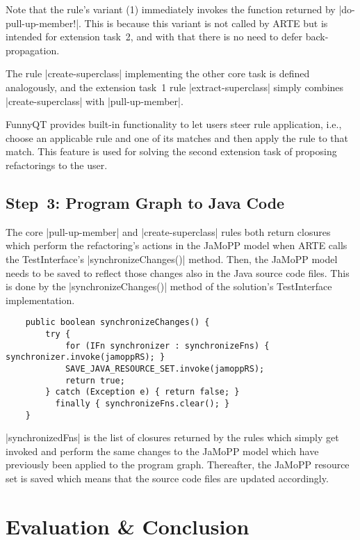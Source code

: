 \documentclass[submission]{eptcs}
\newcommand{\code}{\clojureinline}
\begin{document}
Note that the rule's variant (1) immediately invokes the function returned by
\code|do-pull-up-member!|.  This is because this variant is not called by ARTE
but is intended for extension task~2, and with that there is no need to defer
back-propagation.

The rule \code|create-superclass| implementing the other core task is defined
analogously, and the extension task~1 rule \code|extract-superclass| simply
combines \code|create-superclass| with \code|pull-up-member|.

FunnyQT provides built-in functionality to let users steer rule application,
i.e., choose an applicable rule and one of its matches and then apply the rule
to that match.  This feature is used for solving the second extension task of
proposing refactorings to the user.


\subsection{Step~3: Program Graph to Java Code}
\label{sec:step-3:pg-to-java}

The core \code|pull-up-member| and \code|create-superclass| rules both return
closures which perform the refactoring's actions in the JaMoPP model when ARTE
calls the \textsf{TestInterface}'s \code|synchronizeChanges()| method.  Then,
the JaMoPP model needs to be saved to reflect those changes also in the Java
source code files.  This is done by the \code|synchronizeChanges()| method of
the solution's \textsf{TestInterface} implementation.

\begin{verbatim}
    public boolean synchronizeChanges() {
        try {
            for (IFn synchronizer : synchronizeFns) { synchronizer.invoke(jamoppRS); }
            SAVE_JAVA_RESOURCE_SET.invoke(jamoppRS);
            return true;
        } catch (Exception e) { return false; }
          finally { synchronizeFns.clear(); }
    }
\end{verbatim}

\code|synchronizedFns| is the list of closures returned by the rules which
simply get invoked and perform the same changes to the JaMoPP model which have
previously been applied to the program graph.  Thereafter, the JaMoPP resource
set is saved which means that the source code files are updated accordingly.


\section{Evaluation \& Conclusion}
\label{sec:evaluation}
\end{document}
